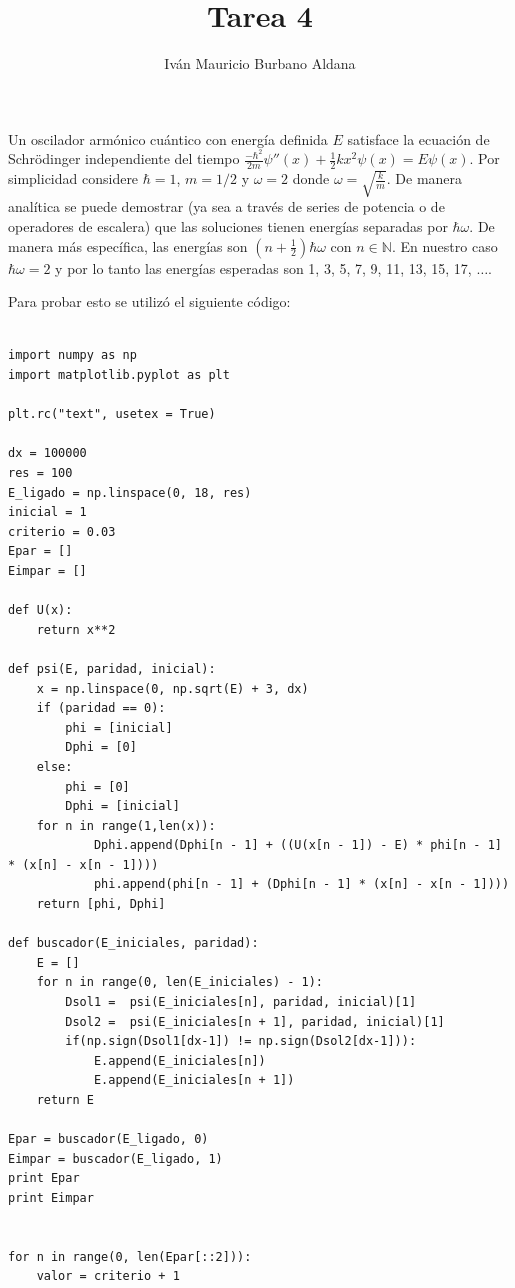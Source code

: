 \documentclass{article}
\title{Tarea 4}
\author{Iv\'an Mauricio Burbano Aldana}
\begin{document}
\maketitle

Un oscilador arm\'onico cu\'antico con energ\'ia definida $E$ satisface la ecuaci\'on de Schr\"odinger independiente del tiempo $\frac{-\hbar^2}{2m}\psi ''(x)+\frac{1}{2}kx^2\psi(x)=E\psi(x)$. Por simplicidad considere $\hbar=1$, $m=1/2$ y $\omega=2$ donde $\omega = \sqrt{\frac{k}{m}}$. De manera anal\'itica se puede demostrar (ya sea a trav\'es de series de potencia o de operadores de escalera) que las soluciones tienen energ\'ias separadas por $\hbar\omega$. De manera m\'as espec\'ifica, las energ\'ias son $\left(n+\frac{1}{2}\right)\hbar\omega$ con $n\in\mathbb{N}$. En nuestro caso $\hbar\omega=2$ y por lo tanto las energ\'ias esperadas son 1, 3, 5, 7, 9, 11, 13, 15, 17, $\dots$. 

Para probar esto se utiliz\'o el siguiente c\'odigo:

\begin{lstlisting}[breaklines = true]

import numpy as np
import matplotlib.pyplot as plt

plt.rc("text", usetex = True)

dx = 100000
res = 100
E_ligado = np.linspace(0, 18, res)
inicial = 1
criterio = 0.03
Epar = []
Eimpar = []

def U(x):
	return x**2

def psi(E, paridad, inicial):
	x = np.linspace(0, np.sqrt(E) + 3, dx)
	if (paridad == 0):
		phi = [inicial]
		Dphi = [0]
	else:
		phi = [0]
		Dphi = [inicial]
	for n in range(1,len(x)):
			Dphi.append(Dphi[n - 1] + ((U(x[n - 1]) - E) * phi[n - 1] * (x[n] - x[n - 1])))
			phi.append(phi[n - 1] + (Dphi[n - 1] * (x[n] - x[n - 1])))
	return [phi, Dphi]

def buscador(E_iniciales, paridad):
	E = []
	for n in range(0, len(E_iniciales) - 1):
		Dsol1 =  psi(E_iniciales[n], paridad, inicial)[1]
		Dsol2 =  psi(E_iniciales[n + 1], paridad, inicial)[1]
		if(np.sign(Dsol1[dx-1]) != np.sign(Dsol2[dx-1])):
			E.append(E_iniciales[n])	
			E.append(E_iniciales[n + 1])	
	return E

Epar = buscador(E_ligado, 0)
Eimpar = buscador(E_ligado, 1)
print Epar
print Eimpar


for n in range(0, len(Epar[::2])):
	valor = criterio + 1

\end{lstlisting}
\end{document}
